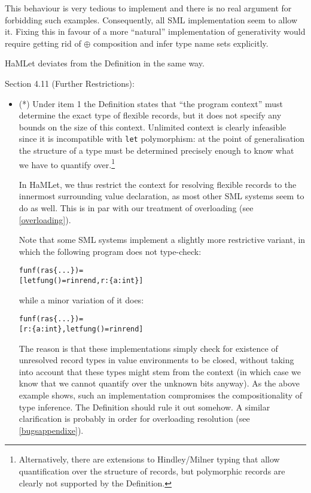 \documentclass[twoside,titlepage]{article}
\begin{document}
\begin{appendix}
\begin{itemize}
{This behaviour is very tedious to implement and there is no real argument for forbidding such examples. Consequently, all SML implementation seem to allow it. Fixing this in favour of a more ``natural'' implementation of generativity would require getting rid of $\oplus$ composition and infer type name sets explicitly.

HaMLet deviates from the Definition in the same way.
}
\end{itemize}


Section 4.11 (Further Restrictions):

\begin{itemize}

\item (*) Under item 1 the Definition states that ``the program context'' must determine the exact type of flexible records, but it does not specify any bounds on the size of this context. Unlimited context is clearly infeasible since it is incompatible with {\tt let} polymorphism: at the point of generalisation the structure of a type must be determined precisely enough to know what we have to quantify over.\footnote{Alternatively, there are extensions to Hindley/Milner typing that allow quantification over the structure of records, but polymorphic records are clearly not supported by the Definition.}

In HaMLet, we thus restrict the context for resolving flexible records to the innermost surrounding value declaration, as most other SML systems seem to do as well. This is in par with our treatment of overloading (see \ref{overloading}).

Note that some SML systems implement a slightly more restrictive variant, in which the following program does not type-check:

\begin{quoting}
\begin{alltt}
fun f(r as \{...\}) =
    [let fun g() = r in r end, r : \{a : int\}]
\end{alltt}
\end{quoting}

while a minor variation of it does:

\begin{quoting}
\begin{alltt}
fun f(r as \{...\}) =
    [r : \{a : int\}, let fun g() = r in r end]
\end{alltt}
\end{quoting}

The reason is that these implementations simply check for existence of unresolved record types in value environments to be closed, without taking into account that these types might stem from the context (in which case we know that we cannot quantify over the unknown bits anyway). As the above example shows, such an implementation compromises the compositionality of type inference. The Definition should rule it out somehow. A similar clarification is probably in order for overloading resolution (see \ref{bugsappendixe}).


\end{itemize}
\end{appendix}
\end{document}
